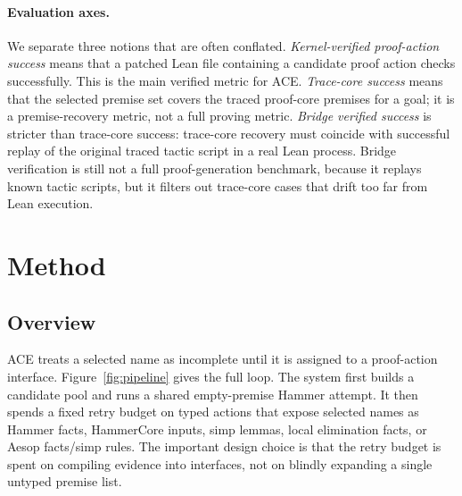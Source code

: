 \documentclass{article}
\newcommand{\tap}{\textsc{ACE}}
\begin{document}
\paragraph{Evaluation axes.}
We separate three notions that are often conflated. \emph{Kernel-verified proof-action success} means that a patched Lean file containing a candidate proof action checks successfully. This is the main verified metric for \tap{}. \emph{Trace-core success} means that the selected premise set covers the traced proof-core premises for a goal; it is a premise-recovery metric, not a full proving metric. \emph{Bridge verified success} is stricter than trace-core success: trace-core recovery must coincide with successful replay of the original traced tactic script in a real Lean process. Bridge verification is still not a full proof-generation benchmark, because it replays known tactic scripts, but it filters out trace-core cases that drift too far from Lean execution.

\section{Method}

\subsection{Overview}

\tap{} treats a selected name as incomplete until it is assigned to a proof-action interface. Figure~\ref{fig:pipeline} gives the full loop. The system first builds a candidate pool and runs a shared empty-premise Hammer attempt. It then spends a fixed retry budget on typed actions that expose selected names as Hammer facts, HammerCore inputs, simp lemmas, local elimination facts, or Aesop facts/simp rules. The important design choice is that the retry budget is spent on compiling evidence into interfaces, not on blindly expanding a single untyped premise list.
\end{document}
